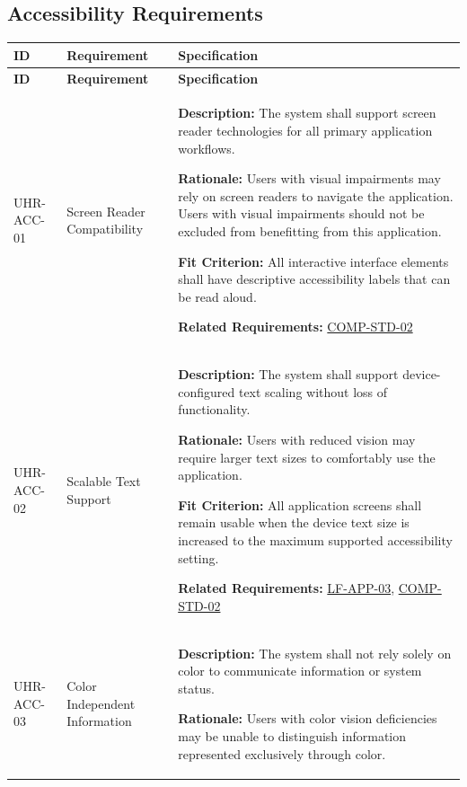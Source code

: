 \documentclass[12pt]{article}
\begin{document}
\subsection{Accessibility Requirements}

\small
\setlength{\tabcolsep}{4pt}
\begin{xltabular}{\textwidth}{|p{2.6cm}|p{3.4cm}|X|}
\hline
\textbf{ID} & \textbf{Requirement} & \textbf{Specification} \\
\hline
\endfirsthead
\hline
\textbf{ID} & \textbf{Requirement} & \textbf{Specification} \\
\hline
\endhead

UHR-ACC-01\hypertarget{req:UHR-ACC-01}{} &
Screen Reader Compatibility &
\textbf{Description:} The system shall support screen reader technologies for all primary application workflows.

\textbf{Rationale:} Users with visual impairments may rely on screen readers to navigate the application. Users with visual impairments should not be excluded from benefitting from this application.

\textbf{Fit Criterion:} All interactive interface elements shall have descriptive accessibility labels that can be read aloud.

\textbf{Related Requirements:} \hyperlink{req:COMP-STD-02}{COMP-STD-02}\\
\hline

UHR-ACC-02\hypertarget{req:UHR-ACC-02}{} &
Scalable Text Support &
\textbf{Description:} The system shall support device-configured text scaling without loss of functionality.

\textbf{Rationale:} Users with reduced vision may require larger text sizes to comfortably use the application.

\textbf{Fit Criterion:} All application screens shall remain usable when the device text size is increased to the maximum supported accessibility setting.

\textbf{Related Requirements:} \hyperlink{req:LF-APP-03}{LF-APP-03}, \hyperlink{req:COMP-STD-02}{COMP-STD-02}\\
\hline

UHR-ACC-03\hypertarget{req:UHR-ACC-03}{} &
Color Independent Information &
\textbf{Description:} The system shall not rely solely on color to communicate information or system status.

\textbf{Rationale:} Users with color vision deficiencies may be unable to distinguish information represented exclusively through color.


\end{xltabular}
\end{document}
